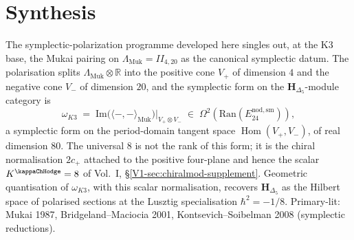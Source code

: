 \section{Synthesis}
\label{sec:sympol-supplement}

\begin{remark}
\label{rem:sympol-1}
The symplectic-polarization programme developed here singles out, at
the K3 base, the Mukai pairing on
$\Lambda_{\mathrm{Muk}} = II_{4,20}$ as the canonical symplectic datum.
The polarisation splits $\Lambda_{\mathrm{Muk}}\otimes\mathbb R$ into
the positive cone $V_+$ of dimension $4$ and the negative cone $V_-$
of dimension $20$, and the symplectic form on the $\mathbf H_{\Delta_5}$-module
category is
\[
\omega_{K3} \;=\;
\mathrm{Im}\bigl(\langle-, -\rangle_{\mathrm{Muk}}\bigr)\bigr|_{V_+\otimes V_-}
\;\in\; \Omega^2(\mathrm{Ran}(E^{\mathrm{nod,sm}}_{24})),
\]
a symplectic form on the period-domain tangent space
\(\operatorname{Hom}(V_+,V_-)\), of real dimension \(80\). The universal
\(8\) is not the rank of this form; it is the chiral normalisation
\(2c_+\) attached to the positive four-plane and hence the scalar
\(K^{\kappaChHodge}=8\) of Vol.~I,
\S\ref{V1-sec:chiralmod-supplement}. Geometric quantisation of
\(\omega_{K3}\), with this scalar normalisation, recovers
\(\mathbf H_{\Delta_5}\) as the Hilbert space of polarised sections at
the Lusztig specialisation
$\hbar^2 = -1/8$. Primary-lit: Mukai 1987, Bridgeland--Maciocia 2001,
Kontsevich--Soibelman 2008 (symplectic reductions).
\end{remark}
